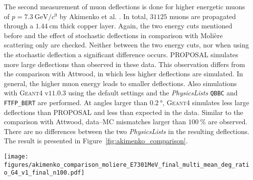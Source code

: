The second measurement of muon deflections is done for higher energetic muons 
of $p = \SI[per-mode=symbol]{7.3}{\giga\electronvolt\per\clight}$ by Akimenko et al. \cite{akimenko_1984}.
In total, $\num{31125}$ muons are propagated through a $\SI{1.44}{\centi\meter}$ thick 
copper layer. Again, the two energy cuts mentioned before and the effect of stochastic deflections 
in comparison with Molière scattering only are checked. 
Neither between the two energy cuts, nor when using the stochastic deflection a significant difference occurs. 
PROPOSAL simulates more large deflections than observed in these data. This observation differs from the comparison with Attwood, 
in which less higher deflections are simulated. In general, the higher muon energy 
leads to smaller deflections. 
Also simulations with \textsc{Geant4} $\text{v}11.0.3$ using the 
default settings and the \textit{PhysicsLists} \texttt{QBBC} and \texttt{FTFP\_BERT} 
are performed. At angles larger than $\SI{0.2}{\degree}$, 
\textsc{Geant4} simulates less large deflections than PROPOSAL and 
less than expected in the data. Similar to the comparison with Attwood, 
data--MC mismatches larger than $\SI{100}{\percent}$ are observed. 
There are no differences between the two \textit{PhysicsLists} in the resulting 
deflections.  
The result is presented in Figure~\ref{fig:akimenko_comparison}.
\begin{figure*}
    \centering 
    \texttt{[image: figures/akimenko\_comparison\_moliere\_E7301MeV\_final\_multi\_mean\_deg\_ratio\_G4\_v1\_final\_n100.pdf]}
    \caption{A comparison between two PROPOSAL simulations
    and measured data by Akimenko et al. \cite{akimenko_1984} 
    is presented for the normalized counts in dependence of the projected scattering angle $\theta_{\mathrm{y}}$ in degree.
    Deflections are simulated with \textsc{Geant4} $\text{v}11.0.3$ as well.
    $\num{100}$ simulations each with $\num{31125}$ muons with 
    $E_{\mathrm{i}} = \SI{7.301}{\giga\electronvolt}$ are propagated through a $\SI{1.44}{\centi\meter}$ 
    copper layer. In PROPOSAL the energy cut 
    $v_{\mathrm{cut}} = \num{e-5}$ is used. The blue points present the mean 
    of the simulation considering stochastic deflections and Molière scattering (MSM), 
    the orange points
    present the mean of the simulation taking into account only 
    Molière scattering. The uncertainties on the $x$--axis result due to the measured bin widths. The $y$--uncertainties are the standard deviations for PROPOSAL and the Poisson errors with $\sqrt{N}$ for Akimenko, with $N$ as number of counts. More large deflections are simulated by PROPOSAL.
    Considering stochastic deflections has no significant impact.}
    \label{fig:akimenko_comparison}
\end{figure*}


